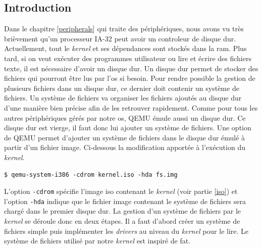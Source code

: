 \label{fs}

\subsection{Introduction}
Dans le chapitre \ref{peripherals} qui traite des périphériques, nous
avons vu très brièvement qu'un processeur \acrshort{IA-32} peut avoir un controleur
de disque dur. Actuellement, tout le \textit{kernel} et ses dépendances sont
stockés dans la \acrshort{ram}. Plus tard, si on veut exécuter des programmes utilisateur
ou lire et écrire des fichiers texte, il est nécessaire d'avoir un disque dur.
Un disque dur permet de stocker des fichiers qui pourront être lus par l'\acrshort{os}
si besoin. Pour rendre possible la gestion de plusieurs fichiers dans un disque
dur, ce dernier doit contenir un système de fichiers. Un système de fichiers va
organiser les fichiers ajoutés au disque dur d'une manière bien précise afin
de les retrouver rapidement.
Comme pour tous les autres périphériques gérés par notre \acrshort{os}, QEMU
émule aussi un disque dur. Ce disque dur est vierge, il faut donc lui ajouter
un système de fichiers. Une option de QEMU permet d'ajouter un système de fichiers
dans le disque dur émulé à partir d'un fichier image. Ci-dessous la modification
apportée à l'exécution du \textit{kernel}.

\begin{verbatim}
$ qemu-system-i386 -cdrom kernel.iso -hda fs.img
\end{verbatim}

L'option  \texttt{-cdrom} spécifie l'image \acrshort{iso} contenant
le \textit{kernel} (voir partie \ref{iso}) et l'option \texttt{-hda} indique
que le fichier image contenant le système de fichiers sera chargé dans le premier
disque dur. La gestion d'un système de fichiers par le \textit{kernel} se déroule
donc en deux étapes. Il a faut d'abord créer un système de fichiers simple
puis implémenter les \textit{drivers} au niveau du \textit{kernel} pour le lire.
Le système de fichiers utilisé par notre \textit{kernel} est inspiré de \acrshort{fat}. \\

